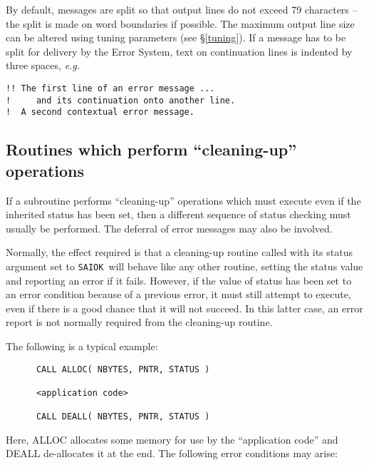 \documentclass[twoside,11pt]{article}
\newcommand{\htmlref}[2]{#1}
\newcommand{\latex}[1]{#1}
\newcommand{\xlabel}[1]{}
\renewcommand{\_}{\texttt{\symbol{95}}}
\newcommand{\const}[1]{\texttt{#1}}
\newcommand{\saiok}{\const{SAI\_\_OK}}
\begin{document}
By default, messages are split so that output lines do not exceed
79 characters -- the split is made on word boundaries if possible.
The maximum output line size can be altered using
\htmlref{tuning parameters}{tuning}\latex{ (see \S\ref{tuning})}.
If a message has to be split for delivery by the Error System, text on
continuation lines is indented by three spaces, \textit{e.g.}
\begin {small}
\begin{verbatim}
!! The first line of an error message ...
!     and its continuation onto another line.
!  A second contextual error message.
\end{verbatim}
\end {small}

\subsection{\xlabel{routines_which_perform_cleaningup_operations}Routines which perform ``cleaning-up'' operations}

If a subroutine performs ``cleaning-up'' operations which must execute even
if the inherited status has been set, then a different sequence of status
checking must usually be performed.
The deferral of error messages may also be involved.

Normally, the effect required is that a cleaning-up routine called with
its status argument set to \saiok\ will behave like any other routine,
setting the status value and reporting an error if it fails.
However, if the value of status has been set to an error condition because of
a previous error, it must still attempt to execute, even if there is a
good chance that it will not succeed.
In this latter case, an error report is not normally required from the
cleaning-up routine.

The following is a typical example:

\begin {small}
\begin{verbatim}
      CALL ALLOC( NBYTES, PNTR, STATUS )

      <application code>

      CALL DEALL( NBYTES, PNTR, STATUS )
\end{verbatim}
\end {small}

Here, ALLOC allocates some memory for use by the ``application code'' and
DEALL de-allocates it at the end.
The following error conditions may arise:
\end{document}
